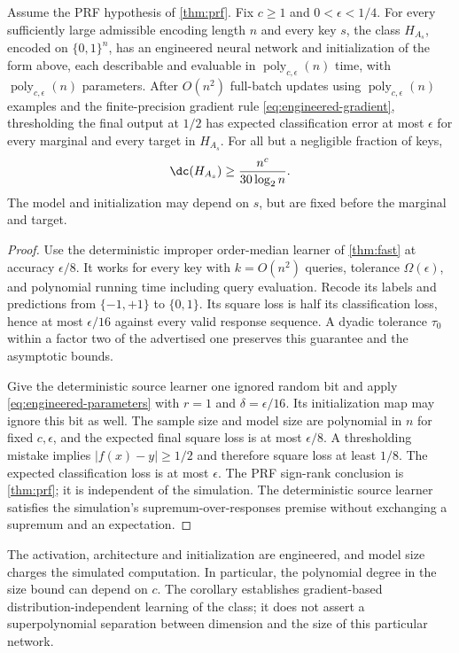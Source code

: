 \begin{corollary}\label{cor:engineered}
Assume the PRF hypothesis of \cref{thm:prf}. Fix $c\ge1$ and $0<\epsilon<1/4$. For every sufficiently large admissible encoding length $n$ and every key $s$, the class $H_{A_s}$, encoded on $\{0,1\}^n$, has an engineered neural network and initialization of the form above, each describable and evaluable in $\operatorname{poly}_{c,\epsilon}(n)$ time, with $\operatorname{poly}_{c,\epsilon}(n)$ parameters. After $O(n^2)$ full-batch updates using $\operatorname{poly}_{c,\epsilon}(n)$ examples and the finite-precision gradient rule \eqref{eq:engineered-gradient}, thresholding the final output at $1/2$ has expected classification error at most $\epsilon$ for every marginal and every target in $H_{A_s}$. For all but a negligible fraction of keys,
\[
 \dc(H_{A_s})\ge\frac{n^c}{30\log_2 n}.
\]
The model and initialization may depend on $s$, but are fixed before the marginal and target.
\end{corollary}
\begin{proof}
Use the deterministic improper order-median learner of \cref{thm:fast} at accuracy $\epsilon/8$. It works for every key with $k=O(n^2)$ queries, tolerance $\Omega(\epsilon)$, and polynomial running time including query evaluation. Recode its labels and predictions from $\{-1,+1\}$ to $\{0,1\}$. Its square loss is half its classification loss, hence at most $\epsilon/16$ against every valid response sequence. A dyadic tolerance $\tau_0$ within a factor two of the advertised one preserves this guarantee and the asymptotic bounds.

Give the deterministic source learner one ignored random bit and apply \eqref{eq:engineered-parameters} with $r=1$ and $\delta=\epsilon/16$. Its initialization map may ignore this bit as well. The sample size and model size are polynomial in $n$ for fixed $c,\epsilon$, and the expected final square loss is at most $\epsilon/8$. A thresholding mistake implies $|f(x)-y|\ge1/2$ and therefore square loss at least $1/8$. The expected classification loss is at most $\epsilon$. The PRF sign-rank conclusion is \cref{thm:prf}; it is independent of the simulation. The deterministic source learner satisfies the simulation's supremum-over-responses premise without exchanging a supremum and an expectation.
\end{proof}

The activation, architecture and initialization are engineered, and model size charges the simulated computation. In particular, the polynomial degree in the size bound can depend on $c$. The corollary establishes gradient-based distribution-independent learning of the class; it does not assert a superpolynomial separation between dimension and the size of this particular network.

